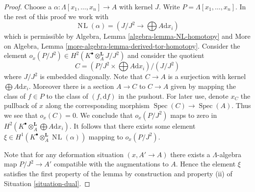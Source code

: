 \documentclass{stacks-project}
\theoremstyle{plain}
\theoremstyle{definition}
\theoremstyle{remark}
\numberwithin{equation}{subsection}
\def\Spec{\mathop{\mathrm{Spec}}}
\def\NL{\mathop{N\!L}\nolimits}
\begin{document}
\begin{proof}
Choose a $\alpha : \Lambda[x_1, \ldots, x_n] \to A$ with kernel $J$.
Write $P = \Lambda[x_1, \ldots, x_n]$. In the rest of this proof we work with
$$
\NL(\alpha) = (J/J^2 \longrightarrow \bigoplus A \text{d}x_i)
$$
which is permissible by
Algebra, Lemma \ref{algebra-lemma-NL-homotopy}
and
More on Algebra, Lemma \ref{more-algebra-lemma-derived-tor-homotopy}.
Consider the element
$o_x(P/J^2) \in H^2(K^\bullet \otimes_A^\mathbf{L} J/J^2)$ and consider
the quotient
$$
C = (P/J^2 \times \bigoplus A \text{d}x_i)/(J/J^2)
$$
where $J/J^2$ is embedded diagonally. Note that $C \to A$ is a surjection
with kernel $\bigoplus A\text{d}x_i$. Moreover there is a section
$A \to C$ to $C \to A$ given by mapping the class of $f \in P$ to the class
of $(f, \text{d}f)$ in the pushout. For later use, denote $x_C$ the
pullback of $x$ along the corresponding morphism $\Spec(C) \to \Spec(A)$.
Thus we see that $o_x(C) = 0$.
We conclude that $o_x(P/J^2)$ maps to zero in
$H^2(K^\bullet \otimes_A^\mathbf{L} \bigoplus A\text{d}x_i)$.
It follows that there exists some element
$\xi \in H^1(K^\bullet \otimes_A^\mathbf{L} \NL(\alpha))$
mapping to $o_x(P/J^2)$.

\medskip\noindent
Note that for any deformation situation $(x, A' \to A)$ there exists
a $\Lambda$-algebra map $P/J^2 \to A'$ compatible with the augmentations
to $A$. Hence the
element $\xi$ satisfies the first property of the lemma by construction
and property (ii) of Situation \ref{situation-dual}.


\end{proof}
\end{document}
